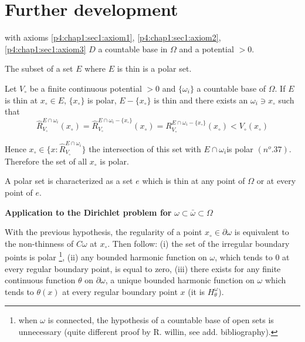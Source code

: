 \section{Further development}\label{p4:chap9:sec40}%

with axioms \ref{p4:chap1:sec1:axiom1}, \ref{p4:chap1:sec1:axiom2},
\ref{p4:chap1:sec1:axiom3} $D$ a countable base in $\Omega$
and a potential $> 0$. 

\begin{thm}\label{p4:chap9:sec40:thm31} %
  The subset of a set $E$ where $E$ is thin is a polar set.
\end{thm} 
 
Let $V_\circ$ be a finite continuous potential $> 0$ and $\{\omega_i\} $
a countable base of $\Omega$. If $E$ is thin at $x_\circ \in E$, $\{x_\circ\}$
is polar, $E - \{x_\circ\}$ is thin and there exists an $\omega_i \ni x_\circ$
such that 
$$
\hat{R}^{E \cap \omega_i}_{V_\circ} (x_\circ) = \hat{R}^{E \cap \omega_i -
  \{x_\circ\}}_{V_\circ} (x_\circ) = R^{E \cap \omega_i - \{x_\circ\}}_{V_\circ} (x_\circ) <
V_\circ (x_\circ) 
$$

Hence $x_\circ \in \big \{x : \hat{R}^{E \cap \omega_i}_{V_\circ} \big \}$ the
intersection of this set with $E \cap \omega_i$\pageoriginale is polar
$(n^o. 37)$. Therefore the set of all $x_\circ$ is polar. 
\begin{coro*} %
  A polar set is characterized as a set $e$ which is thin at any point
  of $\Omega$ or at every point of $e$. 
\end{coro*} 
 
\noindent
\textbf{Application to the Dirichlet problem for } $\omega \subset
\bar{\omega} \subset \Omega$ 
 
\begin{thm}\label{p4:chap9:sec40:thm32} %
  With the previous hypothesis, the regularity of a point $x_\circ \in
  \partial \omega$ is equivalent to the non-thinness of $C \omega$ at
  $x_\circ$. Then follow: (i) the set of the irregular boundary points is
  polar \footnote{when $\omega$ is connected, the hypothesis of a
    countable base of open sets is unnecessary (quite different proof by
    R. willin, see add. bibliography).}, (ii) any bounded harmonic
  function on $\omega$, which tends to 0 at every regular boundary
  point, is equal to zero, (iii) there exists for any finite
  continuous function $\theta$ on $\partial \omega$, a unique bounded
  harmonic function on $\omega$ which tends to $\theta (x)$ at every
  regular boundary point $x$ (it  is $H^\omega_\theta$).   
\end{thm}

